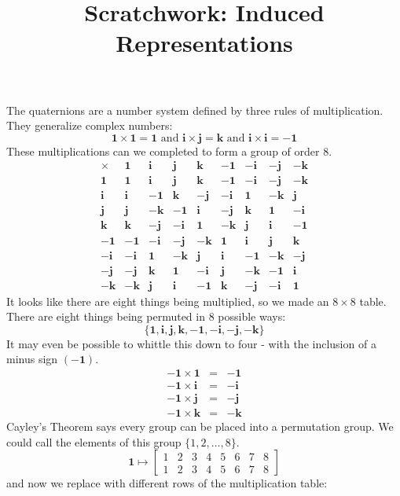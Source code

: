 \documentclass[12pt]{article}
\title{Scratchwork: Induced Representations}
\date{}
\newcommand{\one}{\mathbf{1}}
\newcommand{\ii}{\mathbf{i}}
\newcommand{\jj}{\mathbf{j}}
\newcommand{\kk}{\mathbf{k}}
\begin{document}
\sffamily

\maketitle

\noindent The quaternions are a number system defined by three rules of multiplication.  They generalize complex numbers:
$$ \one \times \one = \one \text{ and } \ii \times \jj = \kk \text{ and } \ii \times \ii = -\one $$
These multiplications can we completed to form a group of order $8$.
$$
\begin{array}{r||rr|rr||rr|rr}
 \times & \one & \ii & \jj & \kk & -\one & -\ii & -\jj & -\kk \\ \hline
\one  & \one & \ii & \jj & \kk & -\one & -\ii & -\jj & -\kk \\
\ii & \ii & -\one & \kk & -\jj & -\ii & \one & -\kk & \jj \\ \hline 
\jj & \jj & - \kk & -\one & \ii & - \jj & \kk & \one & -\ii  \\
\kk & \kk & -\jj & -\ii & \one & -\kk & \jj & \ii & -\one \\ \hline \hline
-\one & -\one & -\ii & -\jj & -\kk & \one & \ii & \jj & \kk\\
-\ii & -\ii & \one & -\kk & \jj & \ii & -\one & -\kk & -\jj\\ \hline
-\jj & -\jj &  \kk & \one & -\ii &  \jj & -\kk & -\one & \ii  \\
-\kk & -\kk & \jj & \ii & -\one & \kk & -\jj & -\ii & \one
\end{array}
 $$
It looks like there are eight things being multiplied, so we made an $8 \times 8$ table.  There are eight things being permuted in 8 possible ways:
$$ \{ \one , \ii , \jj, \kk, -\one, -\ii, -\jj, -\kk \} $$
It may even be possible to whittle this down to four - with the inclusion of a minus sign $(-\one)$.  
\begin{eqnarray*}
-\one \times \one &=& -\one \\
-\one \times \ii  &=& -\ii \\
-\one \times \jj  &=& -\jj \\
-\one \times \kk  &=& -\kk
\end{eqnarray*}
Cayley's Theorem says every group can be placed into a permutation group.  We could call the elements of this group $\{1, 2, \dots, 8\}$. 
$$
\one \mapsto \left[\begin{array}{cccccccc} 1 & 2 & 3 & 4 & 5 & 6 & 7 & 8 \\
 1 & 2 & 3 & 4 & 5 & 6 & 7 & 8  \end{array} \right]
 $$
 and now we replace with different rows of the multiplication table:
 
\end{document}
